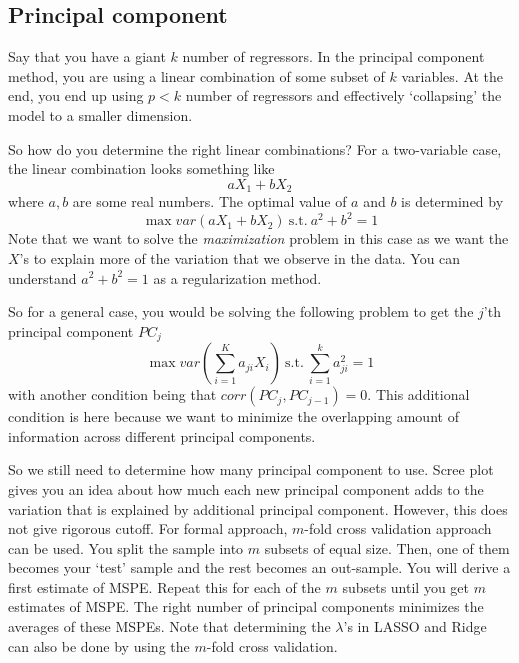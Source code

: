 \documentclass[12pt]{article}
\theoremstyle{definition}
\theoremstyle{property}
\theoremstyle{assumption}
\theoremstyle{example}
\theoremstyle{comment}
\begin{document}
\subsection{Principal component}
Say that you have a giant $k$ number of regressors. In the principal component method, you are using a linear combination of some subset of $k$ variables. At the end, you end up using $p<k$ number of regressors and effectively `collapsing' the model to a smaller dimension. 
\par\medskip
So how do you determine the right linear combinations? For a two-variable case, the linear combination looks something like
\[
aX_1 + bX_2
\]
where $a,b$ are some real numbers. The optimal value of $a$ and $b$ is determined by
\[
\max var(aX_1+bX_2)\  \text{s.t.}\ a^2+b^2=1
\]
Note that we want to solve the \textit{maximization} problem in this case as we want the $X$'s to explain more of the variation that we observe in the data. You can understand $a^2+b^2=1$ as a regularization method. 
\par\medskip
So for a general case, you would be solving the following problem to get the $j$'th principal component $PC_j$
\[
\max var\left(\sum_{i=1}^Ka_{ji}X_i\right)\  \text{s.t.}\ \sum_{i=1}^ka_{ji}^2=1
\]
with another condition being that $corr(PC_j,PC_{j-1})=0$. This additional condition is here because we want to minimize the overlapping amount of information across different principal components.
\par\medskip
So we still need to determine how many principal component to use. Scree plot gives you an idea about how much each new principal component adds to the variation that is explained by additional principal component. However, this does not give rigorous cutoff. For formal approach, $m$-fold cross validation approach can be used. You split the sample into $m$ subsets of equal size. Then, one of them becomes your `test' sample and the rest becomes an out-sample. You will derive a first estimate of MSPE. Repeat this for each of the $m$ subsets until you get $m$ estimates of MSPE. The right number of  principal components minimizes the averages of these MSPEs. Note that determining the $\lambda$'s in LASSO and Ridge can also be done by using the $m$-fold cross validation. 


\end{document}
